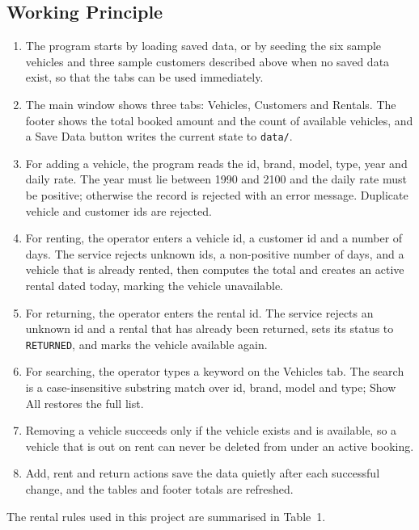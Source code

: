 \documentclass[11pt,a4paper]{article}
\begin{document}
\subsection{Working Principle}

\begin{enumerate}
  \item The program starts by loading saved data, or by seeding the
        six sample vehicles and three sample customers described
        above when no saved data exist, so that the tabs can be used
        immediately.
  \item The main window shows three tabs: Vehicles, Customers and
        Rentals. The footer shows the total booked amount and the
        count of available vehicles, and a Save Data button writes
        the current state to \texttt{data/}.
  \item For adding a vehicle, the program reads the id, brand, model,
        type, year and daily rate. The year must lie between 1990
        and 2100 and the daily rate must be positive; otherwise the
        record is rejected with an error message. Duplicate vehicle
        and customer ids are rejected.
  \item For renting, the operator enters a vehicle id, a customer id
        and a number of days. The service rejects unknown ids, a
        non-positive number of days, and a vehicle that is already
        rented, then computes the total and creates an active
        rental dated today, marking the vehicle unavailable.
  \item For returning, the operator enters the rental id. The service
        rejects an unknown id and a rental that has already been
        returned, sets its status to \texttt{RETURNED}, and marks
        the vehicle available again.
  \item For searching, the operator types a keyword on the Vehicles
        tab. The search is a case-insensitive substring match over
        id, brand, model and type; Show All restores the full list.
  \item Removing a vehicle succeeds only if the vehicle exists and
        is available, so a vehicle that is out on rent can never be
        deleted from under an active booking.
  \item Add, rent and return actions save the data quietly after
        each successful change, and the tables and footer totals are
        refreshed.
\end{enumerate}

The rental rules used in this project are summarised in Table~1.
\end{document}
